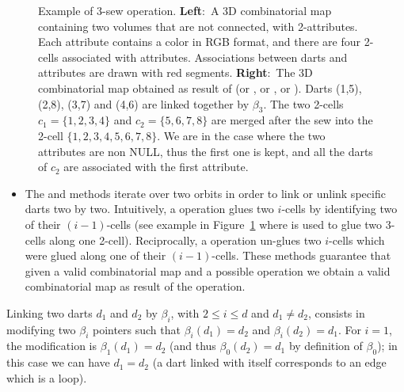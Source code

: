\begin{figure}
\begin{ccHtmlOnly}
  \end{ccHtmlOnly}
  \caption{Example of 3-sew operation. \textbf{Left}:~A 3D
    combinatorial map containing two volumes that are not connected,
    with 2-attributes. Each attribute contains a color in RGB format,
    and there are four 2-cells associated with attributes.
    Associations between darts and attributes are drawn with red
    segments. \textbf{Right}:~The 3D combinatorial map obtained as
    result of  (or , or
    , or ). Darts (1,5), (2,8),
    (3,7) and (4,6) are linked together by $\beta_3$. The two 2-cells
    $c_1=\{1,2,3,4\}$ and $c_2=\{5,6,7,8\}$ are merged after the sew
    into the 2-cell $\{1,2,3,4,5,6,7,8\}$. We are in the case where
    the two attributes are non NULL, thus the first one is kept, and
    all the darts of $c_2$ are associated with the first attribute.}
  \label{fig-exemple-sew}
\end{figure}
\begin{itemize}
\item The  and  methods iterate over two orbits in
  order to link or unlink specific darts two by two.  Intuitively, a
   operation glues two $i$-cells by identifying two of
  their $(i-1)$-cells (see example in Figure~\ref{fig-exemple-sew}
  where  is used to glue two 3-cells along one 2-cell).
  Reciprocally, a  operation un-glues two $i$-cells which
  were glued along one of their $(i-1)$-cells.
  These methods guarantee that given a valid combinatorial map and a
  possible operation we obtain a valid combinatorial map as result of
  the operation.

\end{itemize}

Linking two darts $d_1$ and $d_2$ by $\beta_i$, with $2\leq i\leq d$
and $d_1 \neq d_2$, consists in modifying two $\beta_i$ pointers such that
$\beta_i(d_1)=d_2$ and $\beta_i(d_2)=d_1$. For $i=1$, the modification
is $\beta_1(d_1)=d_2$ (and thus $\beta_0(d_2)=d_1$ by definition of
$\beta_0$); in this case we can have $d_1=d_2$ (a dart linked with
itself corresponds to an edge which is a loop).


